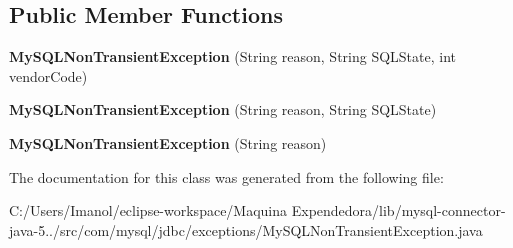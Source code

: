 \subsection*{Public Member Functions}
\begin{DoxyCompactItemize}
\item 
\mbox{\label{classcom_1_1mysql_1_1jdbc_1_1exceptions_1_1_my_s_q_l_non_transient_exception_a180bd7cea99e06bd9326585041eba2fc}} 
{\bfseries My\+S\+Q\+L\+Non\+Transient\+Exception} (String reason, String S\+Q\+L\+State, int vendor\+Code)
\item 
\mbox{\label{classcom_1_1mysql_1_1jdbc_1_1exceptions_1_1_my_s_q_l_non_transient_exception_a18be78718c79bba04593fe53b1d0f5dd}} 
{\bfseries My\+S\+Q\+L\+Non\+Transient\+Exception} (String reason, String S\+Q\+L\+State)
\item 
\mbox{\label{classcom_1_1mysql_1_1jdbc_1_1exceptions_1_1_my_s_q_l_non_transient_exception_adec6ba7ce878caceb2194ca87dd68d7b}} 
{\bfseries My\+S\+Q\+L\+Non\+Transient\+Exception} (String reason)
\end{DoxyCompactItemize}


The documentation for this class was generated from the following file\+:\begin{DoxyCompactItemize}
\item 
C\+:/\+Users/\+Imanol/eclipse-\/workspace/\+Maquina Expendedora/lib/mysql-\/connector-\/java-\/5../src/com/mysql/jdbc/exceptions/My\+S\+Q\+L\+Non\+Transient\+Exception.\+java\end{DoxyCompactItemize}
